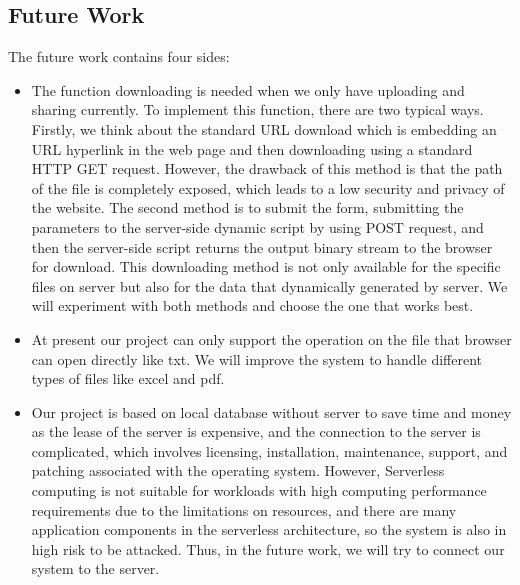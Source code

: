 \subsection{Future Work}

The future work contains four sides:

\begin{itemize}
    \item The function downloading is needed when we only have uploading and sharing currently. To implement this function, there are two typical ways. Firstly, we think about the standard URL download which is embedding an URL hyperlink in the web page and then downloading using a standard HTTP GET request. However, the drawback of this method is that the path of the file is completely exposed, which leads to a low security and privacy of the website. The second method is to submit the form, submitting the parameters to the server-side dynamic script by using POST request, and then the server-side script returns the output binary stream to the browser for download. This downloading method is not only available for the specific files on server but also for the data that dynamically generated by server. We will experiment with both methods and choose the one that works best.
    \item At present our project can only support the operation on the file that browser can open directly like txt. We will improve the system to handle different types of files like excel and pdf. 
    \item Our project is based on local database without server to save time and money as the lease of the server is expensive, and the connection to the server is complicated, which involves licensing, installation, maintenance, support, and patching associated with the operating system. However, Serverless computing is not suitable for workloads with high computing performance requirements due to the limitations on resources, and there are many application components in the serverless architecture, so the system is also in high risk to be attacked. Thus, in the future work, we will try to connect our system to the server.

\end{itemize}


